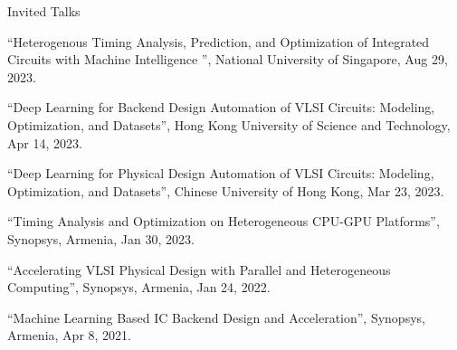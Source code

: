 \begin{rSection}{Invited Talks}
\begin{description}[font=\normalfont]
\item[{[6]}]{
``Heterogenous Timing Analysis, Prediction, and Optimization of Integrated Circuits with Machine Intelligence '', National University of Singapore, Aug 29, 2023. 
}

\item[{[5]}]{
``Deep Learning for Backend Design Automation of VLSI Circuits: Modeling, Optimization, and Datasets'', Hong Kong University of Science and Technology, Apr 14, 2023. 
}

\item[{[4]}]{
``Deep Learning for Physical Design Automation of VLSI Circuits: Modeling, Optimization, and Datasets'', Chinese University of Hong Kong, Mar 23, 2023. 
}

\item[{[3]}]{
``Timing Analysis and Optimization on Heterogeneous CPU-GPU Platforms'', Synopsys, Armenia, Jan 30, 2023. 
}

\item[{[2]}]{
``Accelerating VLSI Physical Design with Parallel and Heterogeneous Computing'', Synopsys, Armenia, Jan 24, 2022. 
}

\item[{[1]}]{
``Machine Learning Based IC Backend Design and Acceleration'', Synopsys, Armenia, Apr 8, 2021. 
}

\end{description}

\end{rSection}
